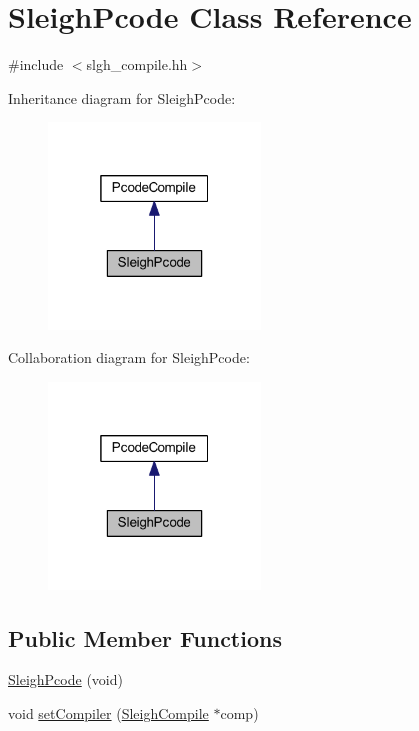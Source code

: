 \hypertarget{class_sleigh_pcode}{}\section{Sleigh\+Pcode Class Reference}
\label{class_sleigh_pcode}


{\ttfamily \#include $<$slgh\+\_\+compile.\+hh$>$}



Inheritance diagram for Sleigh\+Pcode\+:
\nopagebreak
\begin{figure}[H]
\begin{center}
\leavevmode
\includegraphics[width=160pt]{class_sleigh_pcode__inherit__graph}
\end{center}
\end{figure}


Collaboration diagram for Sleigh\+Pcode\+:
\nopagebreak
\begin{figure}[H]
\begin{center}
\leavevmode
\includegraphics[width=160pt]{class_sleigh_pcode__coll__graph}
\end{center}
\end{figure}
\subsection*{Public Member Functions}
\begin{DoxyCompactItemize}
\item 
\mbox{\hyperlink{class_sleigh_pcode_a704c631f50f4a05a7ca7508732b6341f}{Sleigh\+Pcode}} (void)
\item 
void \mbox{\hyperlink{class_sleigh_pcode_a885a81e5b9203ddfb7105c96ca97ef03}{set\+Compiler}} (\mbox{\hyperlink{class_sleigh_compile}{Sleigh\+Compile}} $\ast$comp)
\end{DoxyCompactItemize}
